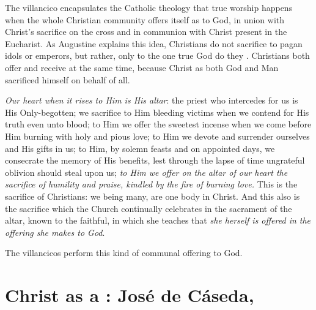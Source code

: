 The villancico encapsulates the Catholic theology that true worship happens
when the whole Christian community offers itself as 
 to God, in union with Christ's sacrifice on the cross and
in communion with Christ present in the Eucharist.
As Augustine explains this idea, Christians do not sacrifice to pagan idols or
emperors, but rather, only to the one true God do they .%
    \Autocite[10:3]{Augustine:CityofGod}
Christians both offer and receive at the same time, because Christ as both God
and Man sacrificed himself on behalf of all.
\begin{quoting}
    \emph{Our heart when it rises to Him is His altar}: the priest who
    intercedes for us is His Only-begotten; we sacrifice to Him bleeding
    victims when we contend for His truth even unto blood; to Him we offer the
    sweetest incense when we come before Him burning with holy and pious love;
    to Him we devote and surrender ourselves and His gifts in us; to Him, by
    solemn feasts and on appointed days, we consecrate the memory of His
    benefits, lest through the lapse of time ungrateful oblivion should steal
    upon us; \emph{to Him we offer on the altar of our heart the sacrifice of
    humility and praise, kindled by the fire of burning love.}
    This is the sacrifice of Christians: we being many, are one body in Christ.
    And this also is the sacrifice which the Church continually celebrates in
    the sacrament of the altar, known to the faithful, in which she teaches
    that \emph{she herself is offered in the offering she makes to God}.%
        \Autocite[10:6, emphasis added]{Augustine:CityofGod}
\end{quoting}
The  villancicos perform this kind of communal offering
to God.


\section[Christ as a \term{Vihuela}]
{Christ as a : José de Cáseda, }

